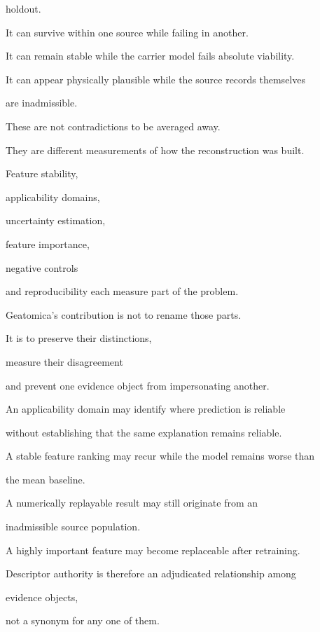 \documentclass[11pt,a4paper,oneside]{report}
\begin{document}
holdout.



It can survive within one source while failing in another.



It can remain stable while the carrier model fails absolute viability.



It can appear physically plausible while the source records themselves

are inadmissible.



These are not contradictions to be averaged away.



They are different measurements of how the reconstruction was built.



\begin{reviewerquestion}



Feature stability,

applicability domains,

uncertainty estimation,

feature importance,

negative controls

and reproducibility each measure part of the problem.



Geatomica's contribution is not to rename those parts.



It is to preserve their distinctions,

measure their disagreement

and prevent one evidence object from impersonating another.



An applicability domain may identify where prediction is reliable

without establishing that the same explanation remains reliable.



A stable feature ranking may recur while the model remains worse than

the mean baseline.



A numerically replayable result may still originate from an

inadmissible source population.



A highly important feature may become replaceable after retraining.



Descriptor authority is therefore an adjudicated relationship among

evidence objects,

not a synonym for any one of them.



\end{reviewerquestion}
\end{document}
